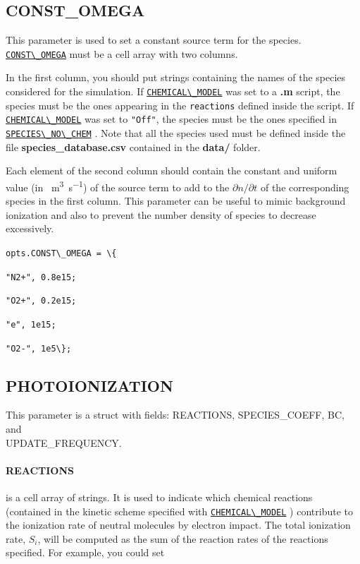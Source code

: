\documentclass[12pt,a4paper]{article}
\newcommand{\matlabs}[1]{{\lstinline[style=MatlabStyle]!#1!}}
\newcommand{\seclink}[2]{%
	\begingroup
	\hypersetup{linkcolor=orange}%
	\hyperref[sec:#1]{\matlabs{#2}}%
	\endgroup
}
\begin{document}
	\subsection{CONST\_OMEGA}
	\label{sec:constomega}
	This parameter is used to set a constant source term for the species. \seclink{constomega}{CONST\_OMEGA} must be a cell array with two columns.
	
	In the first column, you should put strings containing the names of the species considered for the simulation. If \seclink{chemicalmodel}{CHEMICAL\_MODEL} was set to a \textbf{.m} script, the species must be the ones appearing in the \matlabs{reactions} defined inside the script.
	If \seclink{chemicalmodel}{CHEMICAL\_MODEL} was set to \matlabs{"Off"}, the species must be the ones specified in \seclink{speciesnochem}{SPECIES\_NO\_CHEM}. Note that all the species used must be defined inside the file \textbf{species\_database.csv} contained in the \textbf{data/} folder.
	
	Each element of the second column should contain the constant and uniform value (in \unit{\per\cubic\meter\per\second}) of the source term to add to the $\partial n/\partial t$ of the corresponding species in the first column. This parameter can be useful to mimic background ionization and also to prevent the number density of species to decrease excessively.
	
	\matlabs{opts.CONST\_OMEGA = \{}
	
	\hspace{40pt} \matlabs{"N2+", 0.8e15;} 
	
	\hspace{40pt} \matlabs{"O2+", 0.2e15;}
	
	\hspace{40pt} \matlabs{"e", 1e15;}
	
	\hspace{40pt} \matlabs{"O2-", 1e5\};}
	
	\subsection{PHOTOIONIZATION}
	\label{sec:photoionization}
	
	This parameter is a struct with fields: REACTIONS, SPECIES\_COEFF, BC, and \\ UPDATE\_FREQUENCY.

	\paragraph{REACTIONS} is a cell array of strings. It is used to indicate which chemical reactions (contained in the kinetic scheme specified with \seclink{chemicalmodel}{CHEMICAL\_MODEL}) contribute to the ionization rate of neutral molecules by electron impact. The total ionization rate, $S_i$, will be computed as the sum of the reaction rates of the reactions specified. For example, you could set
	
\end{document}
